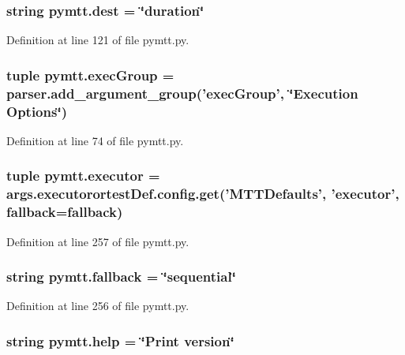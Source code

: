 \hypertarget{namespacepymtt_a9ecea46ee6082edb9bbdd8393829e18e}{
\subsubsection[{dest}]{\setlength{\rightskip}{0pt plus 5cm}string pymtt.\-dest = \char`\"{}duration\char`\"{}}}\label{namespacepymtt_a9ecea46ee6082edb9bbdd8393829e18e}


Definition at line 121 of file pymtt.\-py.

\hypertarget{namespacepymtt_a0f52dbd5d46583e466305a708dea64a1}{
\subsubsection[{exec\-Group}]{\setlength{\rightskip}{0pt plus 5cm}tuple pymtt.\-exec\-Group = parser.\-add\-\_\-argument\-\_\-group('exec\-Group', \char`\"{}Execution Options\char`\"{})}}\label{namespacepymtt_a0f52dbd5d46583e466305a708dea64a1}


Definition at line 74 of file pymtt.\-py.

\hypertarget{namespacepymtt_a283715e769294f7b1362c85498cdf2a3}{
\subsubsection[{executor}]{\setlength{\rightskip}{0pt plus 5cm}tuple pymtt.\-executor = args.\-executorortest\-Def.\-config.\-get('M\-T\-T\-Defaults', 'executor', {\bf fallback}={\bf fallback})}}\label{namespacepymtt_a283715e769294f7b1362c85498cdf2a3}


Definition at line 257 of file pymtt.\-py.

\hypertarget{namespacepymtt_a5d5ee597f85e5c40ec6a923a4398c291}{
\subsubsection[{fallback}]{\setlength{\rightskip}{0pt plus 5cm}string pymtt.\-fallback = \char`\"{}sequential\char`\"{}}}\label{namespacepymtt_a5d5ee597f85e5c40ec6a923a4398c291}


Definition at line 256 of file pymtt.\-py.

\hypertarget{namespacepymtt_a21e88c39af91deb569da20633d245b09}{
\subsubsection[{help}]{\setlength{\rightskip}{0pt plus 5cm}string pymtt.\-help = \char`\"{}Print version\char`\"{}}}\label{namespacepymtt_a21e88c39af91deb569da20633d245b09}


